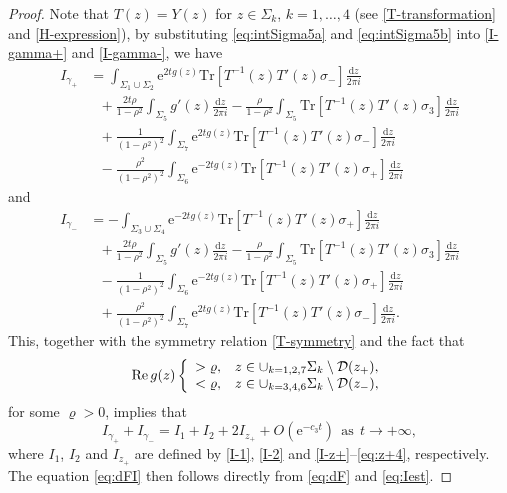 \documentclass[11pt,a4paper]{article}
\numberwithin{equation}{section}
\def\Re {\mathop{\rm Re}\nolimits}
\begin{document}
\begin{proof}
Note that $T(z)=Y(z)$ for $z\in \Sigma_k$, $k=1,\ldots,4$ (see \eqref{T-transformation} and \eqref{H-expression}),
by substituting \eqref{eq:intSigma5a} and \eqref{eq:intSigma5b} into \eqref{I-gamma+} and \eqref{I-gamma-}, we have
\begin{align*}
I_{\gamma_+}&=\int_{\Sigma_1\cup\Sigma_2}\mathrm{e}^{2tg(z)}
\mathrm{Tr}\left[T^{-1}(z)T'(z)\sigma_-\right]\frac{\mathrm{d}z}{2\pi i}\\
&~~~+\frac{2t\rho}{1-\rho^2}\int_{\Sigma_5}g'(z)\frac{\mathrm{d}z}{2\pi i}-\frac{\rho}{1-\rho^2}\int_{\Sigma_5}\mathrm{Tr}\left[T^{-1}(z)T'(z)\sigma_3\right]
\frac{\mathrm{d}z}{2\pi i}\\
&~~~+\frac{1}{(1-\rho^2)^2}\int_{\Sigma_7}\mathrm{e}^{2tg(z)}
\mathrm{Tr}\left[T^{-1}(z)T'(z)\sigma_-\right]\frac{\mathrm{d}z}{2\pi i}\\
&~~~-\frac{\rho^2}{(1-\rho^2)^2}\int_{\Sigma_6}\mathrm{e}^{-2tg(z)}
\mathrm{Tr}\left[T^{-1}(z)T'(z)\sigma_+\right]\frac{\mathrm{d}z}{2\pi i}
\end{align*}
and
\begin{align*}
I_{\gamma_-}&=-\int_{\Sigma_3\cup\Sigma_4}\mathrm{e}^{-2tg(z)}
\mathrm{Tr}\left[T^{-1}(z)T'(z)\sigma_+\right]\frac{\mathrm{d}z}{2\pi i}\\
&~~~+\frac{2t\rho}{1-\rho^2}\int_{\Sigma_5}g'(z)\frac{\mathrm{d}z}{2\pi i}-\frac{\rho}{1-\rho^2}\int_{\Sigma_5}\mathrm{Tr}\left[T^{-1}(z)T'(z)\sigma_3\right]
\frac{\mathrm{d}z}{2\pi i}\\
&~~~-\frac{1}{(1-\rho^2)^2}\int_{\Sigma_6}\mathrm{e}^{-2tg(z)}
\mathrm{Tr}\left[T^{-1}(z)T'(z)\sigma_+\right]\frac{\mathrm{d}z}{2\pi i}\\
&~~~+\frac{\rho^2}{(1-\rho^2)^2}\int_{\Sigma_7}\mathrm{e}^{2tg(z)}
\mathrm{Tr}\left[T^{-1}(z)T'(z)\sigma_-\right]\frac{\mathrm{d}z}{2\pi i}.
\end{align*}
This, together with the symmetry relation  \eqref{T-symmetry} and the fact that
$$
\Re g(z)\left\{
          \begin{array}{ll}
            >\varrho, & \hbox{$z\in \cup_{k=1,2,7}\Sigma_k\setminus \mathcal D(z_+),$} \\
            <\varrho, & \hbox{$z \in \cup_{k=3,4,6}\Sigma_k\setminus \mathcal D(z_-),$}
          \end{array}
        \right.
$$
for some $\varrho>0$, implies that
\begin{equation}\label{eq:Iest}
I_{\gamma_+}+I_{\gamma_-}=I_1+I_2+2I_{z_+}+O\left(\mathrm{e}^{-c_3t}\right) ~~\mathrm{as}~~t\to+\infty,
\end{equation}
where $I_1$, $I_2$ and $I_{z_+}$ are defined by \eqref{I-1}, \eqref{I-2} and \eqref{I-z+}--\eqref{eq:z+4}, respectively.
The equation \eqref{eq:dFI} then follows directly from \eqref{eq:dF} and \eqref{eq:Iest}.
\end{proof}
\end{document}
